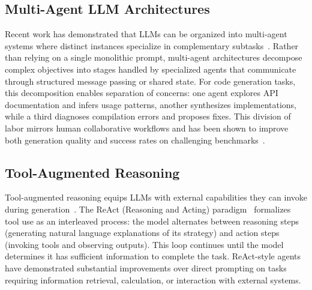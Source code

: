 \subsection{Multi-Agent LLM Architectures}
\label{sec:prelim:llm}

Recent work has demonstrated that LLMs can be organized into multi-agent systems where distinct instances specialize in complementary subtasks~\cite{CITE:MultiAgentCode}. Rather than relying on a single monolithic prompt, multi-agent architectures decompose complex objectives into stages handled by specialized agents that communicate through structured message passing or shared state. For code generation tasks, this decomposition enables separation of concerns: one agent explores API documentation and infers usage patterns, another synthesizes implementations, while a third diagnoses compilation errors and proposes fixes. This division of labor mirrors human collaborative workflows and has been shown to improve both generation quality and success rates on challenging benchmarks~\cite{CITE:AgentBench}.

\subsection{Tool-Augmented Reasoning}
\label{sec:prelim:tools}

Tool-augmented reasoning equips LLMs with external capabilities they can invoke during generation~\cite{DBLP:conf/nips/SchickDSHWSCSW23:Toolformer,CITE:ToolLLM}. The ReAct (Reasoning and Acting) paradigm~\cite{DBLP:conf/iclr/YaoZYDN023:ReAct} formalizes tool use as an interleaved process: the model alternates between reasoning steps (generating natural language explanations of its strategy) and action steps (invoking tools and observing outputs). This loop continues until the model determines it has sufficient information to complete the task. ReAct-style agents have demonstrated substantial improvements over direct prompting on tasks requiring information retrieval, calculation, or interaction with external systems.
